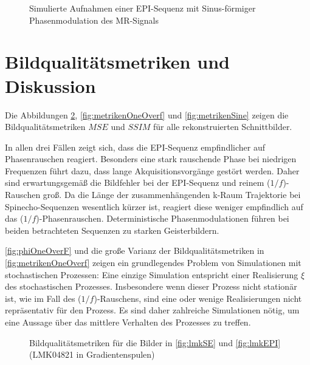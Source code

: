 \begin{figure}[H]
	\hfill
	\caption[Phasenmodulation (EPI-Sequenz)]{Simulierte Aufnahmen einer EPI-Sequenz mit Sinus-förmiger Phasenmodulation des MR-Signals}
	\label{fig:sinemodEPI}	
\end{figure}






\clearpage
\section{Bildqualitätsmetriken und Diskussion}
Die Abbildungen \ref{fig:metrikenLMK}, \ref{fig:metrikenOneOverf} und \ref{fig:metrikenSine} zeigen die Bildqualitätsmetriken $MSE$ und $SSIM$ für alle rekonstruierten Schnittbilder.

In allen drei Fällen zeigt sich, dass die EPI-Sequenz empfindlicher auf Phasenrauschen reagiert. Besonders eine stark rauschende Phase bei niedrigen Frequenzen führt dazu, dass lange Akquisitionsvorgänge gestört werden. Daher sind erwartungsgemäß die Bildfehler bei der EPI-Sequenz und reinem ($1/f$)-Rauschen groß. Da die Länge der zusammenhängenden k-Raum Trajektorie bei Spinecho-Sequenzen wesentlich kürzer ist, reagiert diese weniger empfindlich auf das ($1/f$)-Phasenrauschen. Deterministische Phasenmodulationen führen bei beiden betrachteten Sequenzen zu starken Geisterbildern.

\autoref{fig:phiOneOverF} und die große Varianz der Bildqualitätsmetriken in \autoref{fig:metrikenOneOverf} zeigen ein grundlegendes Problem von Simulationen mit stochastischen Prozessen: Eine einzige Simulation entspricht einer Realisierung $\xi$ des stochastischen Prozesses. Insbesondere wenn dieser Prozess nicht stationär ist, wie im Fall des ($1/f$)-Rauschens, sind eine oder wenige Realisierungen nicht repräsentativ für den Prozess. Es sind daher zahlreiche Simulationen nötig, um eine Aussage über das mittlere Verhalten des Prozesses zu treffen. 

\clearpage

\begin{figure}[H]
	\centering
	\hfill
	\caption[Bildqualitätsmetriken LMK04821]{Bildqualitätsmetriken für die Bilder in \autoref{fig:lmkSE} und \autoref{fig:lmkEPI} (LMK04821 in Gradientenspulen)}
	\label{fig:metrikenLMK}	
\end{figure}

